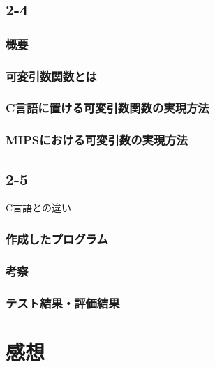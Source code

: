 \documentclass[a4j,11pt]{jarticle}
\begin{document}
 \subsection{2-4}
  \subsubsection{概要}
  \subsubsection{可変引数関数とは}
  \subsubsection{C言語に置ける可変引数関数の実現方法}
  \subsubsection{MIPSにおける可変引数の実現方法}

 \subsection{2-5}


C言語との違い
  \subsubsection{作成したプログラム}

  \subsubsection{考察}
  \subsubsection{テスト結果・評価結果}

\section{感想}
\end{document}
